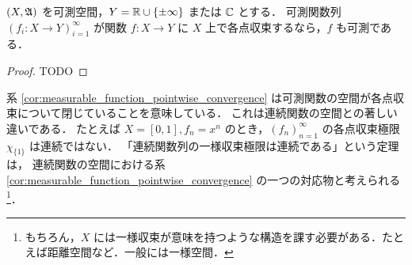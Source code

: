 \begin{corollary}\label{cor:measurable_function_pointwise_convergence}
    $(X,\mathfrak{A})$ を可測空間，$Y=\mathbb{R}\cup\{\pm\infty\}$ または $\mathbb{C}$ とする．
    可測関数列 $(f_i:X\to Y)_{i=1}^\infty$ が関数 $f:X\to Y$ に $X$ 上で各点収束するなら，$f$ も可測である．
\end{corollary}

\begin{proof}
    {\color{red} TODO}
\end{proof}

\begin{remark}
    系 \ref{cor:measurable_function_pointwise_convergence} は可測関数の空間が各点収束について閉じていることを意味している．
    これは連続関数の空間との著しい違いである．
    たとえば $X=[0,1],f_n=x^n$ のとき，$(f_n)_{n=1}^\infty$ の各点収束極限 $\chi_{\{1\}}$ は連続ではない．
    「連続関数列の一様収束極限は連続である」という定理は，
    連続関数の空間における系 \ref{cor:measurable_function_pointwise_convergence} の一つの対応物と考えられる
    \footnote{もちろん，$X$ には一様収束が意味を持つような構造を課す必要がある．たとえば距離空間など．一般には一様空間．}．
\end{remark}
